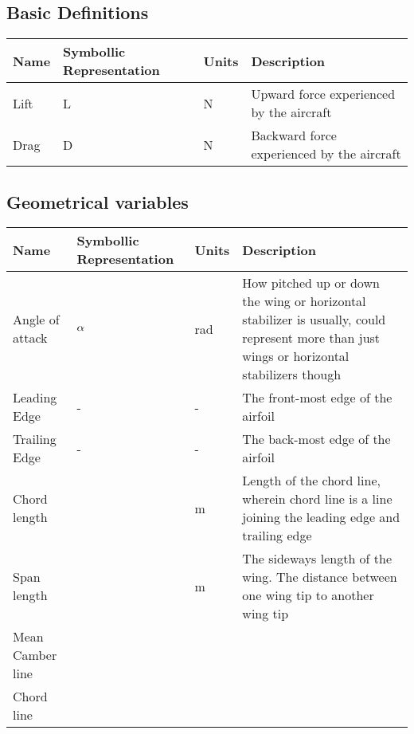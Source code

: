 \documentclass[class=report, 12pt, crop=false]{standalone}
\begin{document}
\begin{center}
\chapter{Basic Definitions}
\begin{comment}
\end{comment}
\begin{comment}
\end{comment}
\begin{tabular}{|m{\tabsize}|m{\tabsize}|m{\tabsize}|m{\tabsizel}|}
\hline
Name & Symbollic Representation & Units & Description \\  
\hline
Lift & L & N & Upward force experienced by the aircraft\\   
\hline
Drag & D & N & Backward force experienced by the aircraft\\
\hline
\end{tabular}
\section{Geometrical variables}
\begin{comment}
\end{comment}
\begin{tabular}{|m{\tabsize}|m{\tabsize}|m{\tabsize}|m{\tabsizel}|}
\hline
Name & Symbollic Representation & Units & Description \\                                                  \hline                                                                                                    
Angle of attack & $\alpha$ & rad & How pitched up or down the wing or horizontal stabilizer is usually, could represent more than just wings or horizontal stabilizers though\\ 
\hline
Leading Edge & - & - & The front-most edge of the airfoil \\
\hline
Trailing Edge & - & - & The back-most edge of the airfoil\\
\hline
Chord length &  & m & Length of the chord line, wherein chord line is a line joining the leading edge and trailing edge\\
\hline
Span length & & m & The sideways length of the wing. The distance between one wing tip to another wing tip\\
\hline
Mean Camber line & & & \\
\hline
Chord line & & & \\
\hline
\end{tabular}

\end{center}
\end{document}
